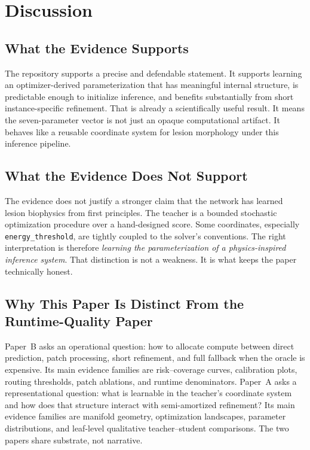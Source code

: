 \documentclass[11pt,a4paper]{article}
\begin{document}
\section{Discussion}
\subsection{What the Evidence Supports}
The repository supports a precise and defendable statement.
It supports learning an optimizer-derived parameterization that has meaningful internal structure, is predictable enough to initialize inference, and benefits substantially from short instance-specific refinement.
That is already a scientifically useful result.
It means the seven-parameter vector is not just an opaque computational artifact.
It behaves like a reusable coordinate system for lesion morphology under this inference pipeline.

\subsection{What the Evidence Does Not Support}
The evidence does not justify a stronger claim that the network has learned lesion biophysics from first principles.
The teacher is a bounded stochastic optimization procedure over a hand-designed score.
Some coordinates, especially \texttt{energy\_threshold}, are tightly coupled to the solver's conventions.
The right interpretation is therefore \emph{learning the parameterization of a physics-inspired inference system}.
That distinction is not a weakness.
It is what keeps the paper technically honest.

\subsection{Why This Paper Is Distinct From the Runtime-Quality Paper}
Paper~B asks an operational question: how to allocate compute between direct prediction, patch processing, short refinement, and full fallback when the oracle is expensive.
Its main evidence families are risk--coverage curves, calibration plots, routing thresholds, patch ablations, and runtime denominators.
Paper~A asks a representational question: what is learnable in the teacher's coordinate system and how does that structure interact with semi-amortized refinement?
Its main evidence families are manifold geometry, optimization landscapes, parameter distributions, and leaf-level qualitative teacher--student comparisons.
The two papers share substrate, not narrative.
\end{document}
